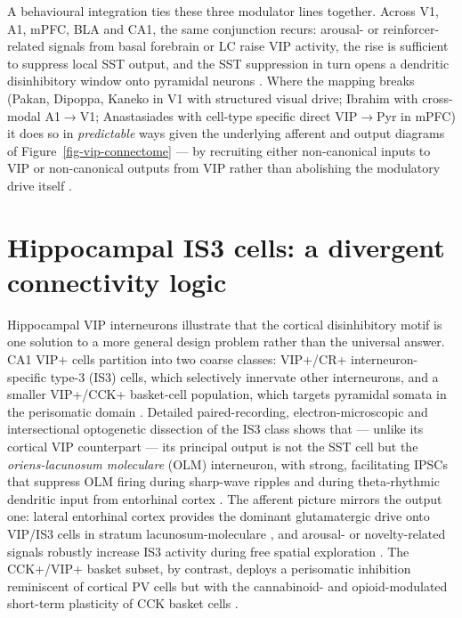\documentclass[11pt]{article}
\let\origrightarrow\rightarrow
\def\rightarrow{\ensuremath{\origrightarrow}}
\begin{document}
A behavioural integration ties these three modulator lines together. Across V1, A1, mPFC, BLA and CA1, the same conjunction recurs: arousal- or reinforcer-related signals from basal forebrain or LC raise VIP activity, the rise is sufficient to suppress local SST output, and the SST suppression in turn opens a dendritic disinhibitory window onto pyramidal neurons \citep{Fu2014, Letzkus2011, Krabbe2019, Pi2013, Sabri2024, Szadai2022, Tamboli2024}. Where the mapping breaks (Pakan, Dipoppa, Kaneko in V1 with structured visual drive; Ibrahim with cross-modal A1\rightarrow V1; Anastasiades with cell-type specific direct VIP\rightarrow Pyr in mPFC) it does so in \textit{predictable} ways given the underlying afferent and output diagrams of Figure~\ref{fig-vip-connectome} --- by recruiting either non-canonical inputs to VIP or non-canonical outputs from VIP rather than abolishing the modulatory drive itself \citep{Pakan2016, Dipoppa2018, Kaneko2024, Ibrahim2016, Anastasiades2021a}.

\section{Hippocampal IS3 cells: a divergent connectivity logic}

Hippocampal VIP interneurons illustrate that the cortical disinhibitory motif is one solution to a more general design problem rather than the universal answer. CA1 VIP+ cells partition into two coarse classes: VIP+/CR+ interneuron-specific type-3 (IS3) cells, which selectively innervate other interneurons, and a smaller VIP+/CCK+ basket-cell population, which targets pyramidal somata in the perisomatic domain \citep{Tyan2014, Turi2019, Francavilla2018a, Booker2018}. Detailed paired-recording, electron-microscopic and intersectional optogenetic dissection of the IS3 class shows that --- unlike its cortical VIP counterpart --- its principal output is not the SST cell but the \textit{oriens-lacunosum moleculare} (OLM) interneuron, with strong, facilitating IPSCs that suppress OLM firing during sharp-wave ripples and during theta-rhythmic dendritic input from entorhinal cortex \citep{Francavilla2018a, Tamboli2024, Turi2019}. The afferent picture mirrors the output one: lateral entorhinal cortex provides the dominant glutamatergic drive onto VIP/IS3 cells in stratum lacunosum-moleculare \citep{Bilash2023, Turi2019, Tyan2014, Booker2018}, and arousal- or novelty-related signals robustly increase IS3 activity during free spatial exploration \citep{Tamboli2024, Turi2019}. The CCK+/VIP+ basket subset, by contrast, deploys a perisomatic inhibition reminiscent of cortical PV cells but with the cannabinoid- and opioid-modulated short-term plasticity of CCK basket cells \citep{Turi2019, Francavilla2018a, Caputi2009}.
\end{document}
